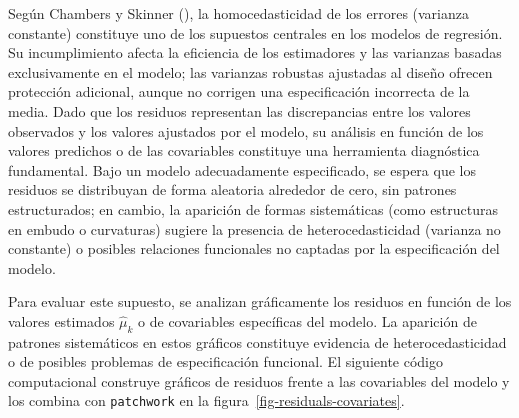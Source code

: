 \documentclass[
  spanish,
  11pt,
  letterpaper,
  oneside,
  open=any]{scrbook}
\begin{document}
Según Chambers y Skinner (), la
homocedasticidad de los errores (varianza constante) constituye uno de
los supuestos centrales en los modelos de regresión. Su incumplimiento
afecta la eficiencia de los estimadores y las varianzas basadas
exclusivamente en el modelo; las varianzas robustas ajustadas al diseño
ofrecen protección adicional, aunque no corrigen una especificación
incorrecta de la media. Dado que los residuos representan las
discrepancias entre los valores observados y los valores ajustados por
el modelo, su análisis en función de los valores predichos o de las
covariables constituye una herramienta diagnóstica fundamental. Bajo un
modelo adecuadamente especificado, se espera que los residuos se
distribuyan de forma aleatoria alrededor de cero, sin patrones
estructurados; en cambio, la aparición de formas sistemáticas (como
estructuras en embudo o curvaturas) sugiere la presencia de
heterocedasticidad (varianza no constante) o posibles relaciones
funcionales no captadas por la especificación del modelo.

Para evaluar este supuesto, se analizan gráficamente los residuos en
función de los valores estimados \(\hat{\mu}_{k}\) o de covariables
específicas del modelo. La aparición de patrones sistemáticos en estos
gráficos constituye evidencia de heterocedasticidad o de posibles
problemas de especificación funcional. El siguiente código computacional
construye gráficos de residuos frente a las covariables del modelo y los
combina con \texttt{patchwork} en la
figura~\ref{fig-residuals-covariates}.
\end{document}
